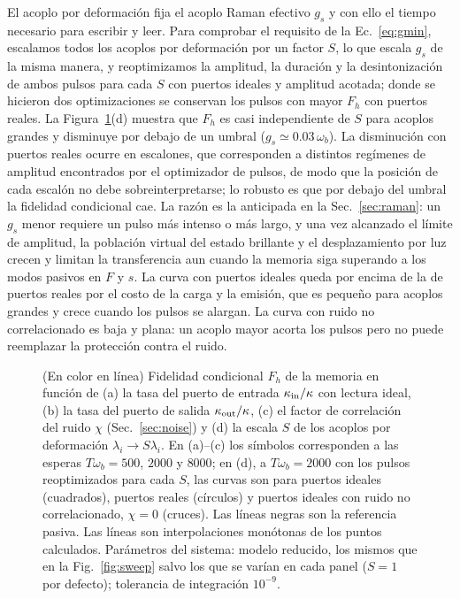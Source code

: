 \documentclass[aps,pra,twocolumn,groupedaddress,amsmath,amssymb,floatfix]{revtex4-2}
\begin{document}
El acoplo por deformaci\'on fija el acoplo Raman efectivo $g_s$ y con ello el tiempo necesario para escribir y leer. Para comprobar el requisito de la Ec.~\eqref{eq:gmin}, escalamos todos los acoplos por deformaci\'on por un factor $S$, lo que escala $g_s$ de la misma manera, y reoptimizamos la amplitud, la duraci\'on y la desintonizaci\'on de ambos pulsos para cada $S$ con puertos ideales y amplitud acotada; donde se hicieron dos optimizaciones se conservan los pulsos con mayor $F_h$ con puertos reales. La Figura~\ref{fig:ports}(d) muestra que $F_h$ es casi independiente de $S$ para acoplos grandes y disminuye por debajo de un umbral ($g_s\simeq0.03\,\omega_b$). La disminuci\'on con puertos reales ocurre en escalones, que corresponden a distintos reg\'imenes de amplitud encontrados por el optimizador de pulsos, de modo que la posici\'on de cada escal\'on no debe sobreinterpretarse; lo robusto es que por debajo del umbral la fidelidad condicional cae. La raz\'on es la anticipada en la Sec.~\ref{sec:raman}: un $g_s$ menor requiere un pulso m\'as intenso o m\'as largo, y una vez alcanzado el l\'imite de amplitud, la poblaci\'on virtual del estado brillante y el desplazamiento por luz crecen y limitan la transferencia aun cuando la memoria siga superando a los modos pasivos en $F$ y $s$. La curva con puertos ideales queda por encima de la de puertos reales por el costo de la carga y la emisi\'on, que es peque\~no para acoplos grandes y crece cuando los pulsos se alargan. La curva con ruido no correlacionado es baja y plana: un acoplo mayor acorta los pulsos pero no puede reemplazar la protecci\'on contra el ruido.

\begin{figure}[t]
\centering
\resizebox{\columnwidth}{!}{}
\caption{(En color en l\'inea) Fidelidad condicional $F_h$ de la memoria en funci\'on de (a) la tasa del puerto de entrada $\kappa_{\rm in}/\kappa$ con lectura ideal, (b) la tasa del puerto de salida $\kappa_{\rm out}/\kappa$, (c) el factor de correlaci\'on del ruido $\chi$ (Sec.~\ref{sec:noise}) y (d) la escala $S$ de los acoplos por deformaci\'on $\lambda_i\to S\lambda_i$. En (a)--(c) los s\'imbolos corresponden a las esperas $T\omega_b=500$, $2000$ y $8000$; en (d), a $T\omega_b=2000$ con los pulsos reoptimizados para cada $S$, las curvas son para puertos ideales (cuadrados), puertos reales (c\'irculos) y puertos ideales con ruido no correlacionado, $\chi=0$ (cruces). Las l\'ineas negras son la referencia pasiva. Las l\'ineas son interpolaciones mon\'otonas de los puntos calculados. Par\'ametros del sistema: modelo reducido, los mismos que en la Fig.~\ref{fig:sweep} salvo los que se var\'ian en cada panel ($S=1$ por defecto); tolerancia de integraci\'on $10^{-9}$.}
\label{fig:ports}
\end{figure}
\end{document}
